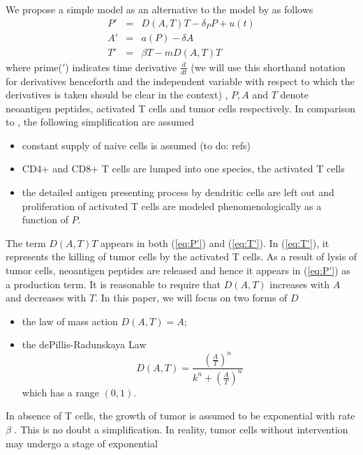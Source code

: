 \documentclass[review,authoryear]{elsarticle}
\begin{document}
We propose a simple model as an alternative to the model by \cite{Messan2021} as follows
\begin{subequations}\label{eq:3sp-model}
\begin{eqnarray} 
P' & = & D(A,T)T-\delta_{P}P+u(t)\label{eq:P'}\\
A' & = & a(P)-\delta A\label{eq:A'}\\
T' & = & \beta T-mD(A,T)T\label{eq:T'}
\end{eqnarray}
\end{subequations}
where prime($'$) indicates time derivative $\frac{d}{dt}$ (we will
use this shorthand notation for derivatives henceforth and the independent
variable with respect to which the derivatives is taken should be
clear in the context) , $P,A$ and $T$ denote neoantigen peptides,
activated T cells and tumor cells respectively. In comparison to \cite{Messan2021},
the following simplification are assumed
\begin{itemize}
\item constant supply of naive cells is assumed (to do: refs)
\item CD4+ and CD8+ T cells are lumped into one species, the activated T
cells 
\item the detailed antigen presenting process by dendritic cells are left
out and proliferation of activated T cells are modeled phenomenologically
as a function of $P$.
\end{itemize}
The term $D(A,T)T$ appears in both (\ref{eq:P'}) and (\ref{eq:T'}).
In (\ref{eq:T'}), it represents the killing of tumor cells by the
activated T cells. As a result of lysis of tumor cells, neoantigen
peptides are released \citep{Konstorum2017} and hence it appears in
(\ref{eq:P'}) as a production term. It is reasonable to require that
$D(A,T)$ increases with $A$ and decreases with $T$. In this paper,
we will focus on two forms of $D$
\begin{itemize}
\item the law of mass action $D(A,T)=A$;
\item the dePillis-Radunskaya Law 
\begin{equation}
D(A,T)=\frac{(\frac{A}{T})^{n}}{k^{n}+(\frac{A}{T})^{n}}\label{eq:PR law-1}
\end{equation}
which has a range $(0,1)$. 
\end{itemize}
In absence of T cells, the growth of tumor is assumed to be exponential
with rate $\beta$ . This is no doubt a simplification. In reality,
tumor cells without intervention may undergo a stage of exponential
\end{document}
